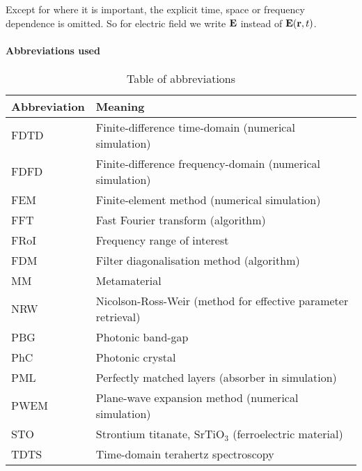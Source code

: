 Except for where it is important, the explicit time, space or frequency dependence is omitted. So for electric field we write $\mathbf{E}$ instead of $\mathbf{E}({\mathbf{r}},t)$.

\paragraph{Abbreviations used} %
\begin{table}[ht]   \caption{Table of abbreviations}  \label{tb_shortcuts} \centering 
\begin{tabular}{ll}
 \toprule
Abbreviation & Meaning	\\
 \hline
FDTD 		& Finite-difference time-domain (numerical simulation)\\
FDFD 		& Finite-difference frequency-domain (numerical simulation)\\
FEM 		& Finite-element method (numerical simulation)\\
FFT 		& Fast Fourier transform (algorithm)\\
FRoI 		& Frequency range of interest\\
FDM 		& Filter diagonalisation method (algorithm)\\
MM			& Metamaterial\\
NRW 		& Nicolson-Ross-Weir (method for effective parameter retrieval)\\
PBG			& Photonic band-gap\\
PhC 		& Photonic crystal\\
PML 		& Perfectly matched layers (absorber in simulation)\\
PWEM 		& Plane-wave expansion method (numerical simulation)\\
STO			& Strontium titanate, SrTiO$_3$ (ferroelectric material)\\
TDTS 		& Time-domain terahertz spectroscopy\\
 \bottomrule
 \end{tabular} \end{table}


